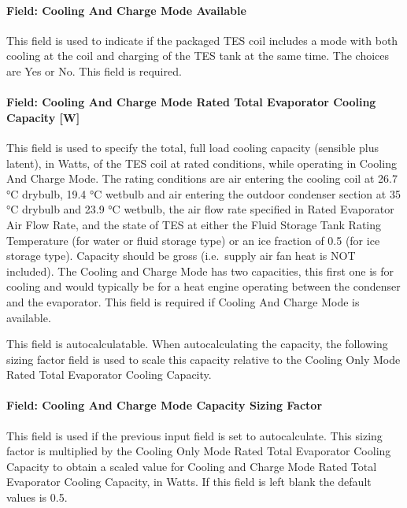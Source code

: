 \paragraph{Field: Cooling And Charge Mode Available}\label{field-cooling-and-charge-mode-available}

This field is used to indicate if the packaged TES coil includes a mode with both cooling at the coil and charging of the TES tank at the same time. The choices are Yes or No. This field is required.

\paragraph{Field: Cooling And Charge Mode Rated Total Evaporator Cooling Capacity {[}W{]}}\label{field-cooling-and-charge-mode-rated-total-evaporator-cooling-capacity-w}

This field is used to specify the total, full load cooling capacity (sensible plus latent), in Watts, of the TES coil at rated conditions, while operating in Cooling And Charge Mode. The rating conditions are air entering the cooling coil at 26.7 °C drybulb, 19.4 °C wetbulb and air entering the outdoor condenser section at 35 °C drybulb and 23.9 °C wetbulb, the air flow rate specified in Rated Evaporator Air Flow Rate, and the state of TES at either the Fluid Storage Tank Rating Temperature (for water or fluid storage type) or an ice fraction of 0.5 (for ice storage type). Capacity should be gross (i.e.~supply air fan heat is NOT included). The Cooling and Charge Mode has two capacities, this first one is for cooling and would typically be for a heat engine operating between the condenser and the evaporator. This field is required if Cooling And Charge Mode is available.

This field is autocalculatable. When autocalculating the capacity, the following sizing factor field is used to scale this capacity relative to the Cooling Only Mode Rated Total Evaporator Cooling Capacity.

\paragraph{Field: Cooling And Charge Mode Capacity Sizing Factor}\label{field-cooling-and-charge-mode-capacity-sizing-factor}

This field is used if the previous input field is set to autocalculate. This sizing factor is multiplied by the Cooling Only Mode Rated Total Evaporator Cooling Capacity to obtain a scaled value for Cooling and Charge Mode Rated Total Evaporator Cooling Capacity, in Watts. If this field is left blank the default values is 0.5.

